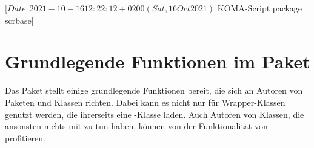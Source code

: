 %
%
%
%
%
%
%
%
% 
%
%
%
%

                 [$Date: 2021-10-16 12:22:12 +0200 (Sat, 16 Oct 2021) $
                  KOMA-Script package scrbase]

\chapter{Grundlegende Funktionen im Paket }
\BeginIndexGroup
{}%

Das Paket  stellt einige grundlegende Funktionen bereit, die
sich an Autoren von Paketen und Klassen richten. Dabei kann es nicht nur für
Wrapper-Klassen genutzt werden, die ihrerseits eine \KOMAScript-Klasse
laden. Auch Autoren von Klassen, die ansonsten nichts mit \KOMAScript{} zu tun
haben, können von der Funktionalität von  profitieren.

